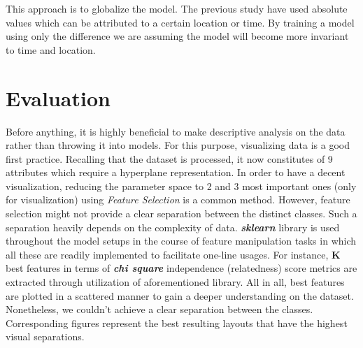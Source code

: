 \documentclass[conference]{IEEEtran}
\begin{document}
This approach is to globalize the model. The previous study \cite{Pedersen} have used absolute values which can be attributed to a certain location or time. By training a model using only the difference we are assuming the model will become more invariant to time and location.


\section{Evaluation}
Before anything, it is highly beneficial to make descriptive analysis on the data rather than throwing it into models. For this purpose, visualizing data is a good first practice. Recalling that the dataset is processed, it now constitutes of 9 attributes which require a hyperplane representation. In order to have a decent visualization, reducing the parameter space to 2 and 3 most important ones (only for visualization) using \textit{Feature Selection}\cite{Guyon} is a common method. However, feature selection might not provide a clear separation between the distinct classes. Such a separation heavily depends on the complexity of data. \textit{\textbf{sklearn}} library is used throughout the model setups in the course of feature manipulation tasks in which all these are readily implemented to facilitate one-line usages. For instance, \textbf{K} best features in terms of \textit{\textbf{chi square}}\cite{Fahim} independence (relatedness) score metrics are extracted through utilization of aforementioned library. All in all, best features are plotted in a scattered manner to gain a deeper understanding on the dataset. Nonetheless, we couldn't achieve a clear separation between the classes. Corresponding figures represent the best resulting layouts that have the highest visual separations.
\end{document}
